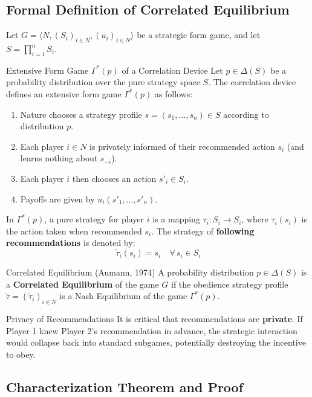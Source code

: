 \documentclass[12pt, a4paper]{article}
\begin{document}
\subsection{Formal Definition of Correlated Equilibrium}

Let $G = \langle N, (S_i)_{i \in N}, (u_i)_{i \in N} \rangle$ be a strategic form game, and let $S = \prod_{i=1}^n S_i$.

\begin{defbox}{Extensive Form Game $\Gamma^*(p)$ of a Correlation Device}
Let $p \in \Delta(S)$ be a probability distribution over the pure strategy space $S$. The correlation device defines an extensive form game $\Gamma^*(p)$ as follows:
\begin{enumerate}
    \item Nature chooses a strategy profile $s = (s_1, \dots, s_n) \in S$ according to distribution $p$.
    \item Each player $i \in N$ is privately informed of their recommended action $s_i$ (and learns nothing about $s_{-i}$).
    \item Each player $i$ then chooses an action $s'_i \in S_i$.
    \item Payoffs are given by $u_i(s'_1, \dots, s'_n)$.
\end{enumerate}
In $\Gamma^*(p)$, a pure strategy for player $i$ is a mapping $\tau_i : S_i \to S_i$, where $\tau_i(s_i)$ is the action taken when recommended $s_i$. The strategy of \textbf{following recommendations} is denoted by:
\[
  \tilde{\tau}_i(s_i) = s_i \quad \forall\, s_i \in S_i
\]
\end{defbox}

\begin{defbox}{Correlated Equilibrium (Aumann, 1974)}
A probability distribution $p \in \Delta(S)$ is a \textbf{Correlated Equilibrium} of the game $G$ if the obedience strategy profile $\tilde{\tau} = (\tilde{\tau}_i)_{i \in N}$ is a Nash Equilibrium of the game $\Gamma^*(p)$.
\end{defbox}

\begin{warnbox}{Privacy of Recommendations}
It is critical that recommendations are \textbf{private}. If Player 1 knew Player 2's recommendation in advance, the strategic interaction would collapse back into standard subgames, potentially destroying the incentive to obey.
\end{warnbox}

\subsection{Characterization Theorem and Proof}
\end{document}
